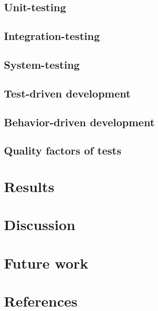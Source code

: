 \documentclass[a4paper]{report}
\begin{document}
  \section{Unit-testing}
  \label{sec:unit_testing}
  

  \section{Integration-testing}
  

  \section{System-testing}
  

  \section{Test-driven development}
  \label{sec:tdd}
  

  \section{Behavior-driven development}
  

  \section{Quality factors of tests}
  


\chapter{Results}

  


\chapter{Discussion}

  


\chapter{Future work}

  

\newpage

\chapter*{References}
\begin{multicols}{2}
    \small
    \renewcommand{\bibsection}{ \vspace{-\baselineskip}\vspace{-1.1mm} }
    
    
\end{multicols}
\end{document}
